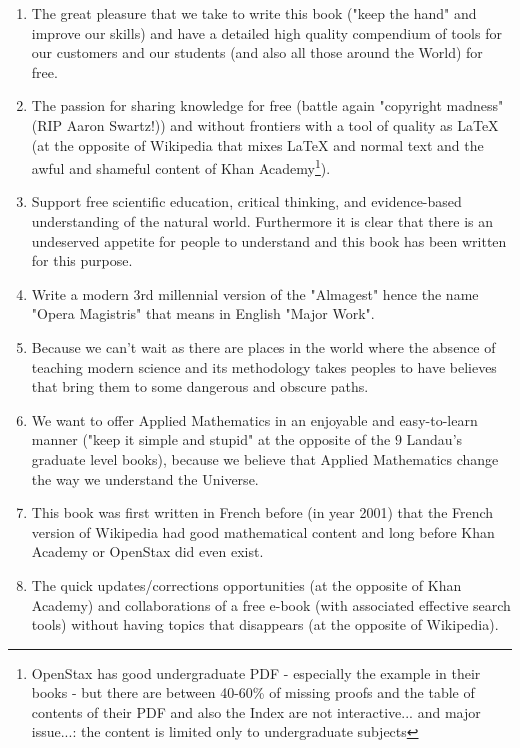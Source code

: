 	\begin{enumerate}
		\item The great pleasure that we take to write this book ("keep the hand" and improve our skills) and have a detailed high quality compendium of tools for our customers and our students (and also all those around the World) for free.

		\item The passion for sharing knowledge for free (battle again "copyright madness" (RIP Aaron Swartz!)) and without frontiers with a tool of quality as \LaTeX{} (at the opposite of Wikipedia that mixes \LaTeX{} and normal text and the awful and shameful content of Khan Academy\footnote{OpenStax has good undergraduate PDF - especially the example in their books - but there are between 40-60\% of missing proofs and the table of contents of their PDF and also the Index are not interactive... and major issue...: the content is limited only to undergraduate subjects}).
		
		\item Support free scientific education, critical thinking, and evidence-based understanding of the natural world. Furthermore it is clear that there is an undeserved appetite for people to understand and this book has been written for this purpose.
		
		\item Write a modern 3rd millennial version of the "Almagest" hence the name "Opera Magistris" that means in English "Major Work".
		
		\item Because we can't wait as there are places in the world where the absence of teaching modern science and its methodology takes peoples to have believes that bring them to some dangerous and obscure paths.
		
		\item We want to offer Applied Mathematics in an enjoyable and easy-to-learn manner ("keep it simple and stupid" at the opposite of the $9$ Landau's graduate level books), because we believe that Applied Mathematics change the way we understand the Universe.
		
		\item This book was first written in French before (in year 2001) that the French version of Wikipedia had good mathematical content and long before Khan Academy or OpenStax did even exist.

		\item The quick updates/corrections opportunities (at the opposite of Khan Academy) and collaborations of a free e-book (with associated effective search tools) without having topics that disappears (at the opposite of Wikipedia).


\end{enumerate}
